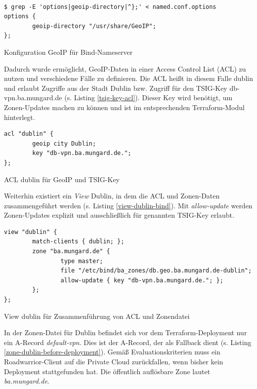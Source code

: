 \begin{listing}[h]
\begin{verbatim}

$ grep -E 'options|geoip-directory|^};' < named.conf.options
options {
        geoip-directory "/usr/share/GeoIP";
};

\end{verbatim}
\caption{Konfiguration GeoIP für Bind-Nameserver}
\label{bind-geoip-directory}
\end{listing}\FloatBarrier
Dadurch wurde ermöglicht, \gls{GeoIP}-Daten in einer Access Control List (\gls{ACL}) zu nutzen und verschiedene Fälle zu definieren. Die \gls{ACL} heißt in diesem Falle \glqq dublin\grqq{} und erlaubt Zugriffe aus der Stadt Dublin bzw. Zugriff für den \gls{TSIG}-Key \glqq db-vpn.ba.mungard.de\grqq{} (s. Listing \ref{tsig-key-acl}). Dieser Key wird benötigt, um Zonen-Updates machen zu können und ist im entsprechenden Terraform-Modul hinterlegt.
\begin{listing}[h]
\begin{verbatim}
acl "dublin" {
        geoip city Dublin;
        key "db-vpn.ba.mungard.de.";
};
\end{verbatim}
\caption{ACL \glqq dublin\grqq{} für GeoIP und TSIG-Key}
\label{tsig-key-acl}
\end{listing}\FloatBarrier
Weiterhin existiert ein \textit{\gls{View}} \glqq Dublin\grqq{}, in dem die \gls{ACL} und Zonen-Daten zusammengeführt werden (s. Listing \ref{view-dublin-bind}). Mit \textit{allow-update} werden Zonen-Updates explizit und ausschließlich für genannten \gls{TSIG}-Key erlaubt.
\begin{listing}[h]
\begin{verbatim}
view "dublin" {
        match-clients { dublin; };
        zone "ba.mungard.de" {
                type master;
                file "/etc/bind/ba_zones/db.geo.ba.mungard.de-dublin";
                allow-update { key "db-vpn.ba.mungard.de."; };
        };
};
\end{verbatim}
\caption{View \glqq dublin\grqq{} für Zusammenführung von ACL und Zonendatei}
\label{view-dublin-bind}
\end{listing}\FloatBarrier
In der Zonen-Datei für Dublin befindet sich vor dem Terraform-\gls{Deployment} nur ein A-Record \textit{default-vpn}. Dies ist der A-Record, der als Fallback dient (s. Listing \ref{zone-dublin-before-deployment}). Gemäß Evaluationskriterien muss ein \gls{Roadwarrior}-\gls{Client} auf die Private Cloud zurückfallen, wenn bisher kein \gls{Deployment} stattgefunden hat. Die öffentlich auflösbare Zone lautet \textit{ba.mungard.de}.

